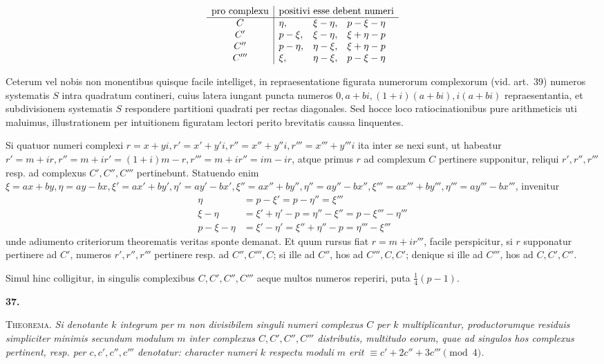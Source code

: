 %
\[
\begin{array}{c|lll}
\text{pro complexu}&\multicolumn{3}{c}{\text{positivi esse debent numeri}}\\\hline
C&\eta,&\xi-\eta,&p-\xi-\eta\\
C'&p-\xi,&\xi-\eta,&\xi+\eta-p\\
C''&p-\eta,&\eta-\xi,&\xi+\eta-p\\
C'''&\xi,&\eta-\xi,&p-\xi-\eta
\end{array}
\]

Ceterum vel nobis non monentibus quisque facile intelliget, in repraesentatione figurata numerorum complexorum (vid. art.~39) numeros systematis $S$ intra quadratum contineri, cuius latera iungant puncta numeros $0,a+bi,(1+i)(a+bi),i(a+bi)$ repraesentantia, et subdivisionem systematis $S$ respondere partitioni quadrati per rectas diagonales. Sed hocce loco ratiocinationibus pure arithmeticis uti maluimus, illustrationem per intuitionem figuratam lectori perito brevitatis caussa linquentes.

Si quatuor numeri complexi $r=x+yi,r'=x'+y'i,r''=x''+y''i,r'''=x'''+y'''i$ ita inter se nexi sunt, ut habeatur $r'=m+ir,r''=m+ir'=(1+i)m-r,r'''=m+ir''=im-ir$, atque primus $r$ ad complexum $C$ pertinere supponitur, reliqui $r',r'',r'''$ resp. ad complexus $C',C'',C'''$ pertinebunt. Statuendo enim $\xi=ax+by,\eta=ay-bx,\xi'=ax'+by',\eta'=ay'-bx',\xi''=ax''+by'',\eta''=ay''-bx'',\xi'''=ax'''+by''',\eta'''=ay'''-bx'''$, invenitur
\[
\begin{aligned}
\eta&=p-\xi'=p-\eta''=\xi'''\\
\xi-\eta&=\xi'+\eta'-p=\eta''-\xi''=p-\xi'''-\eta'''\\
p-\xi-\eta&=\xi'-\eta'=\xi''+\eta''-p=\eta'''-\xi'''
\end{aligned}
\]
unde adiumento criteriorum theorematis veritas sponte demanat. Et quum rursus fiat $r=m+ir'''$, facile perspicitur, si $r$ supponatur pertinere ad $C'$, numeros $r',r'',r'''$ pertinere resp. ad $C'',C''',C$; si ille ad $C''$, hos ad $C''',C,C'$; denique si ille ad $C'''$, hos ad $C,C',C''$.

Simul hinc colligitur, in singulis complexibus $C,C',C'',C'''$ aeque multos numeros reperiri, puta $\frac14(p-1)$.

\par\medskip{}\centerline{\textbf{37.}}\nobreak\smallskip
\textsc{Theorema.} \emph{Si denotante $k$ integrum per $m$ non divisibilem singuli numeri complexus $C$ per $k$ multiplicantur, productorumque residuis simpliciter minimis secundum
%
modulum $m$ inter complexus $C,C',C'',C'''$ distributis, multitudo eorum, quae ad singulos hos complexus pertinent, resp. per $c,c',c'',c'''$ denotatur: character numeri $k$ respectu moduli $m$ erit $\equiv c'+2c''+3c'''\pmod4$.}

